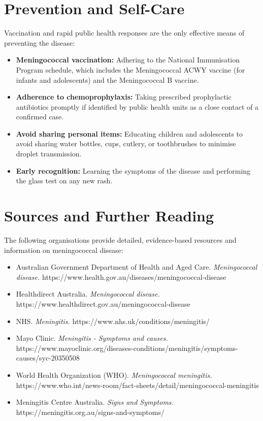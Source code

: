 \section*{Prevention and Self-Care}
Vaccination and rapid public health responses are the only effective means of preventing the disease:
\begin{itemize}
    \item \textbf{Meningococcal vaccination:} Adhering to the National Immunisation Program schedule, which includes the Meningococcal ACWY vaccine (for infants and adolescents) and the Meningococcal B vaccine.
    \item \textbf{Adherence to chemoprophylaxis:} Taking prescribed prophylactic antibiotics promptly if identified by public health units as a close contact of a confirmed case.
    \item \textbf{Avoid sharing personal items:} Educating children and adolescents to avoid sharing water bottles, cups, cutlery, or toothbrushes to minimise droplet transmission.
    \item \textbf{Early recognition:} Learning the symptoms of the disease and performing the glass test on any new rash.
\end{itemize}

\section*{Sources and Further Reading}
The following organisations provide detailed, evidence-based resources and information on meningococcal disease:
\begin{itemize}
    \item Australian Government Department of Health and Aged Care. \textit{Meningococcal disease.} https://www.health.gov.au/diseases/meningococcal-disease
    \item Healthdirect Australia. \textit{Meningococcal disease.} https://www.healthdirect.gov.au/meningococcal-disease
    \item NHS. \textit{Meningitis.} https://www.nhs.uk/conditions/meningitis/
    \item Mayo Clinic. \textit{Meningitis - Symptoms and causes.} https://www.mayoclinic.org/diseases-conditions/meningitis/symptoms-causes/syc-20350508
    \item World Health Organization (WHO). \textit{Meningococcal meningitis.} https://www.who.int/news-room/fact-sheets/detail/meningococcal-meningitis
    \item Meningitis Centre Australia. \textit{Signs and Symptoms.} https://meningitis.org.au/signs-and-symptoms/
\end{itemize}
